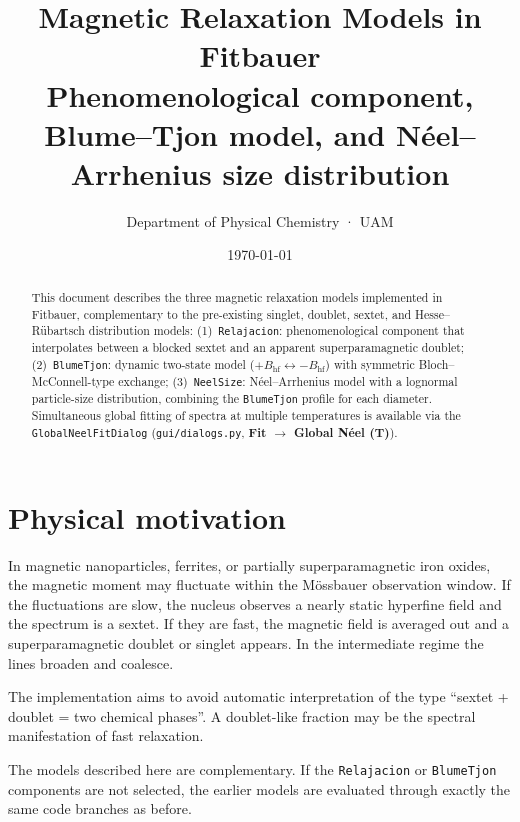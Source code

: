 \documentclass[11pt,a4paper]{article}
\title{\textbf{Magnetic Relaxation Models in Fitbauer}\\[3pt]
\large Phenomenological component, Blume--Tjon model, and N\'{e}el--Arrhenius size distribution}
\author{Department of Physical Chemistry · UAM}
\date{\today}
\newcommand{\BHF}{B_{\mathrm{hf}}}
\newcommand{\code}[1]{\texttt{\small #1}}
\begin{document}
\maketitle

\begin{abstract}\noindent
This document describes the three magnetic relaxation models implemented
in Fitbauer, complementary to the pre-existing singlet, doublet, sextet, and
Hesse--R\"{u}bartsch distribution models:
(1)~\code{Relajacion}: phenomenological component that interpolates between a
blocked sextet and an apparent superparamagnetic doublet;
(2)~\code{BlumeTjon}: dynamic two-state model ($+\BHF \leftrightarrow -\BHF$)
with symmetric Bloch--McConnell-type exchange;
(3)~\code{NeelSize}: N\'{e}el--Arrhenius model with a lognormal particle-size
distribution, combining the \code{BlumeTjon} profile for each diameter.
Simultaneous global fitting of spectra at multiple temperatures is available
via the \code{GlobalNeelFitDialog} (\code{gui/dialogs.py},
\textbf{Fit $\to$ Global N\'{e}el (T)}).
\end{abstract}

\tableofcontents
\bigskip

\section{Physical motivation}

In magnetic nanoparticles, ferrites, or partially superparamagnetic iron
oxides, the magnetic moment may fluctuate within the M\"{o}ssbauer observation
window. If the fluctuations are slow, the nucleus observes a nearly static
hyperfine field and the spectrum is a sextet. If they are fast, the magnetic
field is averaged out and a superparamagnetic doublet or singlet appears. In the
intermediate regime the lines broaden and coalesce.

The implementation aims to avoid automatic interpretation of the type
``sextet + doublet = two chemical phases''. A doublet-like fraction may be the
spectral manifestation of fast relaxation.

\begin{aviso}
The models described here are complementary. If the \code{Relajacion} or
\code{BlumeTjon} components are not selected, the earlier models are evaluated
through exactly the same code branches as before.
\end{aviso}

\end{document}
